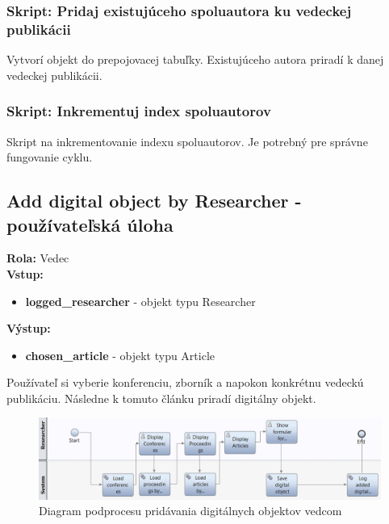 \documentclass[10pt,oneside,slovak,a4paper]{article}
\begin{document}
\subsubsection{Skript: Pridaj existujúceho spoluautora ku vedeckej publikácii}
Vytvorí objekt do prepojovacej tabuľky. Existujúceho autora priradí k danej vedeckej publikácii.

\subsubsection{Skript: Inkrementuj index spoluautorov}
Skript na inkrementovanie indexu spoluautorov. Je potrebný pre správne fungovanie cyklu.

\subsection{Add digital object by Researcher - používateľská úloha}
\textbf{Rola:} Vedec\\
\textbf{Vstup:}

\begin{itemize}
\item \textbf{logged\_researcher} - objekt typu Researcher
\end{itemize}

\textbf{Výstup:}

\begin{itemize}
\item \textbf{chosen\_article} - objekt typu Article
\end{itemize}

Používateľ si vyberie konferenciu, zborník a napokon konkrétnu vedeckú publikáciu. Následne k tomuto článku priradí digitálny objekt.

\begin{figure} [H]
\centering
\includegraphics[scale=0.4]{diagrams/diagAddDigital.jpg} 
\caption{Diagram podprocesu pridávania digitálnych objektov vedcom}
\end{figure}
\end{document}
